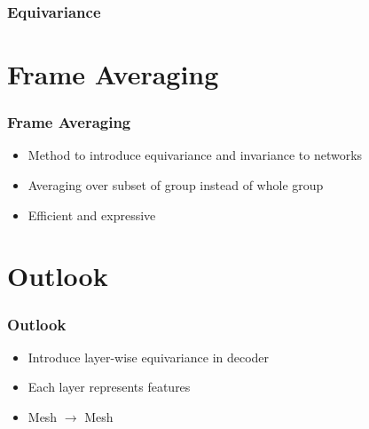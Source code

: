 \documentclass{beamer}
\begin{document}
\begin{frame}
\frametitle{Equivariance}
\begin{figure}[h]
\end{figure}
\end{frame}


\section{Frame Averaging}
\begin{frame}
\frametitle{Frame Averaging}
\begin{itemize}
\item<2-> Method to introduce equivariance and invariance to networks
\medskip
\item<3-> Averaging over subset of group instead of whole group
\medskip
\item<4-> Efficient and expressive
\end{itemize}
\end{frame}

\section{Outlook}
\begin{frame}
\frametitle{Outlook}
\begin{itemize}
\item<2-> Introduce layer-wise equivariance in decoder
\medskip
\item<3-> Each layer represents features
\medskip
\item<4-> Mesh $\rightarrow$ Mesh
\end{itemize}
\end{frame}
\end{document}
